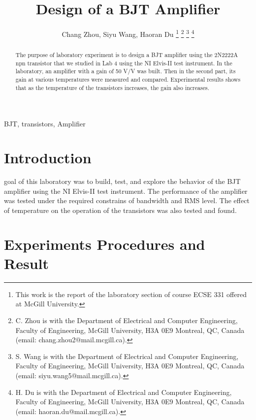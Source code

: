\documentclass[journal]{IEEEtran}
\begin{document}
\begin{titlepage}

\end{titlepage}
\title{Design of a BJT Amplifier}
\author{Chang Zhou, Siyu Wang, Haoran Du
\thanks{This work is the report of the laboratory section of course ECSE 331 offered at McGill University.}
\thanks{C. Zhou is with the Department of Electrical and Computer
Engineering, Faculty of Engineering, McGill University, H3A 0E9 Montreal, QC, Canada
(email: chang.zhou2@mail.mcgill.ca).}
\thanks{S. Wang is with the Department of Electrical and Computer
Engineering, Faculty of Engineering, McGill University, H3A 0E9 Montreal, QC, Canada
(email: siyu.wang5@mail.mcgill.ca).}
\thanks{H. Du is with the Department of Electrical and Computer
Engineering, Faculty of Engineering, McGill University, H3A 0E9 Montreal, QC, Canada
(email: haoran.du@mail.mcgill.ca).}}

\maketitle

\begin{abstract}
The purpose of laboratory experiment is to design a BJT amplifier using the 2N2222A npn transistor that we studied in
Lab 4 using the NI Elvis-II test instrument. In the laboratory, an amplifier with a gain of 50 \si{\volt}/\si{\volt} was built. Then in the second part, its gain at various temperatures were measured and compared. Experimental results shows that as the temperature of the transistors increases, the gain also increases.
\end{abstract}

\begin{IEEEkeywords}
  BJT, transistors, Amplifier
\end{IEEEkeywords}

\section{Introduction}

 goal of this laboratory was to build, test, and explore the behavior of the BJT amplifier using the NI Elvis-II test instrument. The performance of the amplifier was tested under the required constrains of bandwidth and RMS level. The effect of temperature on the operation of the transistors was also tested and found.
\section{Experiments Procedures and Result}
\end{document}
